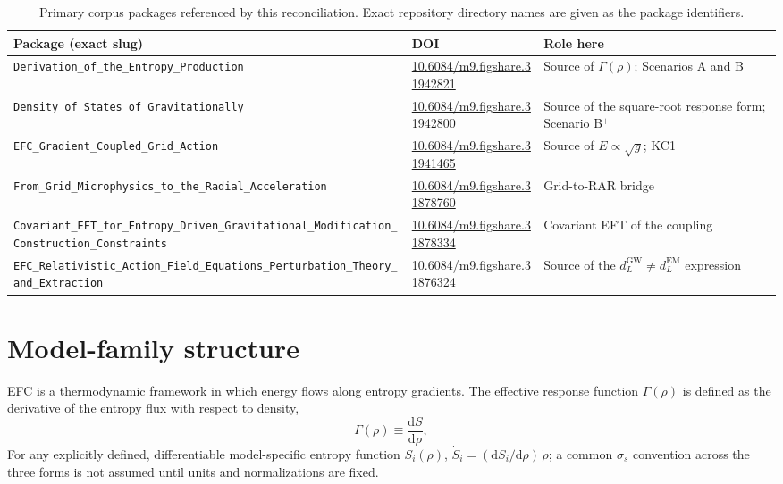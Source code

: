 \documentclass[11pt,a4paper]{article}
\begin{document}
\begin{table}[ht]
\centering
\small
\begin{tabularx}{\textwidth}{@{}>{\raggedright\arraybackslash}p{5.6cm} >{\raggedright\arraybackslash}p{3.9cm} >{\raggedright\arraybackslash}X@{}}
\toprule
Package (exact slug) & DOI & Role here \\
\midrule
\texttt{Derivation\_\allowbreak of\_\allowbreak the\_\allowbreak Entropy\_\allowbreak Production} & \url{10.6084/m9.figshare.31942821} & Source of $\Gamma(\rho)$; Scenarios A and B \\
\texttt{Density\_\allowbreak of\_\allowbreak States\_\allowbreak of\_\allowbreak Gravitationally} & \url{10.6084/m9.figshare.31942800} & Source of the square-root response form; Scenario B$^{+}$ \\
\texttt{EFC\_\allowbreak Gradient\_\allowbreak Coupled\_\allowbreak Grid\_\allowbreak Action} & \url{10.6084/m9.figshare.31941465} & Source of $E \propto \sqrt{g}$; KC1 \\
\texttt{From\_\allowbreak Grid\_\allowbreak Microphysics\_\allowbreak to\_\allowbreak the\_\allowbreak Radial\_\allowbreak Acceleration} & \url{10.6084/m9.figshare.31878760} & Grid-to-RAR bridge \\
\texttt{Covariant\_\allowbreak EFT\_\allowbreak for\_\allowbreak Entropy\_\allowbreak Driven\_\allowbreak Gravitational\_\allowbreak Modification\_\allowbreak Construction\_\allowbreak Constraints} & \url{10.6084/m9.figshare.31878334} & Covariant EFT of the coupling \\
\texttt{EFC\_\allowbreak Relativistic\_\allowbreak Action\_\allowbreak Field\_\allowbreak Equations\_\allowbreak Perturbation\_\allowbreak Theory\_\allowbreak and\_\allowbreak Extraction} & \url{10.6084/m9.figshare.31876324} & Source of the $d_{L}^{\mathrm{GW}} \neq d_{L}^{\mathrm{EM}}$ expression \\
\bottomrule
\end{tabularx}
\caption{Primary corpus packages referenced by this reconciliation. Exact repository directory names are given as the package identifiers.}
\label{tab:corpus}
\end{table}

\section{Model-family structure}

EFC is a thermodynamic framework in which energy flows along entropy gradients. The effective response function $\Gamma(\rho)$ is defined as the derivative of the entropy flux with respect to density,
\begin{equation}
\Gamma(\rho) \equiv \frac{\mathrm{d}S}{\mathrm{d}\rho},
\end{equation}
For any explicitly defined, differentiable model-specific entropy function $S_{i}(\rho)$, $\dot{S}_{i} = (\mathrm{d}S_{i}/\mathrm{d}\rho)\,\dot{\rho}$; a common $\sigma_{s}$ convention across the three forms is not assumed until units and normalizations are fixed.
\end{document}
